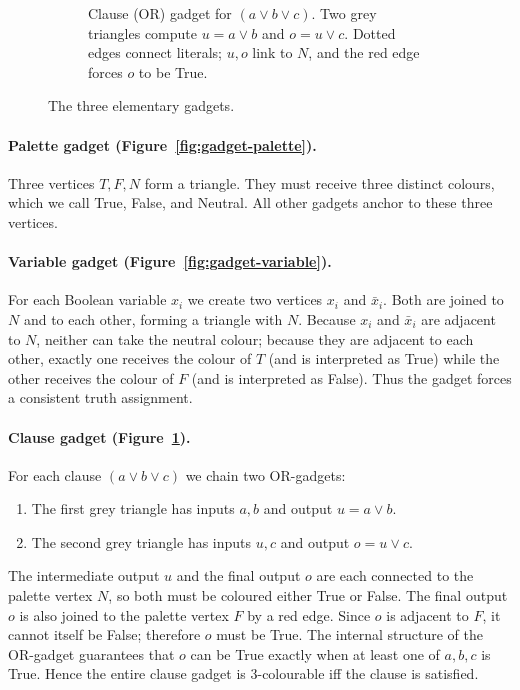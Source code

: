 \documentclass[manuscript,nonacm]{acmart}
\theoremstyle{definition}
\begin{document}
\begin{figure}[htbp]
\begin{subfigure}[b]{0.36\textwidth}
\caption{Clause (OR) gadget for $(a\vee b\vee c)$.  Two grey triangles compute
$u=a\vee b$ and $o=u\vee c$.  Dotted edges connect literals; $u,o$ link to
$N$, and the red edge forces $o$ to be True.}
\label{fig:gadget-or}
\end{subfigure}
\caption{The three elementary gadgets.}
\label{fig:gadgets}
\end{figure}

\paragraph{Palette gadget (Figure~\ref{fig:gadget-palette}).}
Three vertices $T,F,N$ form a triangle.  They must receive three distinct
colours, which we call True, False, and Neutral.  All other gadgets anchor to
these three vertices.

\paragraph{Variable gadget (Figure~\ref{fig:gadget-variable}).}
For each Boolean variable $x_i$ we create two vertices $x_i$ and $\bar x_i$.
Both are joined to $N$ and to each other, forming a triangle with $N$.  Because
$x_i$ and $\bar x_i$ are adjacent to $N$, neither can take the neutral colour;
because they are adjacent to each other, exactly one receives the colour of $T$
(and is interpreted as True) while the other receives the colour of $F$ (and is
interpreted as False).  Thus the gadget forces a consistent truth assignment.

\paragraph{Clause gadget (Figure~\ref{fig:gadget-or}).}
For each clause $(a\vee b\vee c)$ we chain two OR-gadgets:
\begin{enumerate}
  \item The first grey triangle has inputs $a,b$ and output $u=a\vee b$.
  \item The second grey triangle has inputs $u,c$ and output $o=u\vee c$.
\end{enumerate}
The intermediate output $u$ and the final output $o$ are each connected to the
palette vertex $N$, so both must be coloured either True or False.  The final
output $o$ is also joined to the palette vertex $F$ by a red edge.  Since $o$ is
adjacent to $F$, it cannot itself be False; therefore $o$ must be True.  The
internal structure of the OR-gadget guarantees that $o$ can be True exactly when
at least one of $a,b,c$ is True.  Hence the entire clause gadget is $3$-colourable
iff the clause is satisfied.
\end{document}
